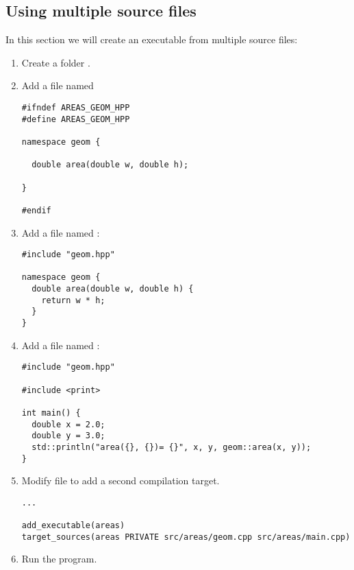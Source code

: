 \subsection{Using multiple source files}

In this section we will create an executable from multiple source files:

\begin{enumerate}

\item
Create a folder
.

\item
Add a file named

\begin{lstlisting}
#ifndef AREAS_GEOM_HPP
#define AREAS_GEOM_HPP

namespace geom {

  double area(double w, double h);

}

#endif
\end{lstlisting}

\item 
Add a file named
:

\begin{lstlisting}
#include "geom.hpp"

namespace geom {
  double area(double w, double h) {
    return w * h;
  }
}
\end{lstlisting}

\item
Add a file named
:

\begin{lstlisting}
#include "geom.hpp"

#include <print>

int main() {
  double x = 2.0;
  double y = 3.0;
  std::println("area({}, {})= {}", x, y, geom::area(x, y));
}
\end{lstlisting}

\item
Modify file  to add a second compilation target.

\begin{lstlisting}
...

add_executable(areas)
target_sources(areas PRIVATE src/areas/geom.cpp src/areas/main.cpp)
\end{lstlisting}

\item
Run the program.

\end{enumerate}
